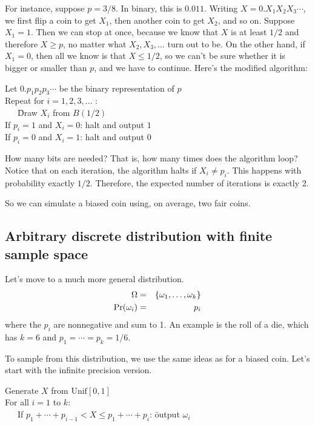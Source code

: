 For instance, suppose $p = 3/8$. In binary, this is $0.011$. Writing 
$X = 0.X_1X_2X_3\cdots$, we first flip a coin to get $X_1$, then another
coin to get $X_2$, and so on. Suppose $X_1 = 1$. Then we can stop at once, because
we know that $X$ is at least $1/2$ and therefore $X \geq p$, no matter what 
$X_2, X_3, \ldots$ turn out to be. On the other hand, if $X_1 = 0$, then all we 
know is that $X \leq 1/2$, so we can't be sure whether it is bigger or smaller
than $p$, and we have to continue. Here's the modified algorithm:

\begin{tt}
\begin{tabbing}
Let $0.p_1p_2p_3 \cdots$ be the binary representation of $p$ \\
Repeat for $i = 1, 2, 3, \ldots$ :  \\
\ \ \ \= Draw $X_i$ from $B(1/2)$  \\
      \> If $p_i = 1$ and $X_i = 0$: halt and output $1$ \\
      \> If $p_i = 0$ and $X_i = 1$: halt and output $0$ 
\end{tabbing}
\end{tt}

\noindent
How many bits are needed? That is, how many times does the algorithm loop?
Notice that on each iteration, the algorithm halts if $X_i \neq p_i$. This
happens with probability exactly $1/2$. Therefore, the expected number of
iterations is exactly 2.

So we can simulate a biased coin using, on average, two fair coins.

\subsection{Arbitrary discrete distribution with finite sample space}

Let's move to a much more general distribution.
\begin{eqnarray*}
\Omega & = & \{\omega_1, \ldots, \omega_k\}\\
\mbox{\rm Pr}(\omega_i) & = & p_i 
\end{eqnarray*}
where the $p_i$ are nonnegative and sum to 1. An example is the roll of a die, 
which has $k=6$ and $p_1 = \cdots = p_k = 1/6$.

To sample from this distribution, we use the same ideas as for a biased coin. Let's
start with the infinite precision version.

\begin{tt}
\begin{tabbing}
Generate $X$ from $\mbox{Unif}[0,1]$ \\
For all $i = 1$ to $k$: \\
\ \ \ If $p_1 + \cdots + p_{i-1} < X \leq p_1 + \cdots + p_i$: \= output $\omega_i$
\end{tabbing}
\end{tt}



